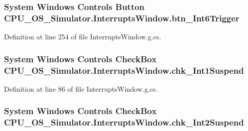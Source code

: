 \subsubsection[{btn\+\_\+\+Int6\+Trigger}]{\setlength{\rightskip}{0pt plus 5cm}System Windows Controls Button C\+P\+U\+\_\+\+O\+S\+\_\+\+Simulator.\+Interrupts\+Window.\+btn\+\_\+\+Int6\+Trigger\hspace{0.3cm}{\ttfamily [package]}}\label{class_c_p_u___o_s___simulator_1_1_interrupts_window_a40f87b0cde439b851823b9f37c5e8adf}


Definition at line 254 of file Interrupts\+Window.\+g.\+cs.

\hypertarget{class_c_p_u___o_s___simulator_1_1_interrupts_window_a5dfca155c40a8043ed74854d0368dd5f}{}
\subsubsection[{chk\+\_\+\+Int1\+Suspend}]{\setlength{\rightskip}{0pt plus 5cm}System Windows Controls Check\+Box C\+P\+U\+\_\+\+O\+S\+\_\+\+Simulator.\+Interrupts\+Window.\+chk\+\_\+\+Int1\+Suspend\hspace{0.3cm}{\ttfamily [package]}}\label{class_c_p_u___o_s___simulator_1_1_interrupts_window_a5dfca155c40a8043ed74854d0368dd5f}


Definition at line 86 of file Interrupts\+Window.\+g.\+cs.

\hypertarget{class_c_p_u___o_s___simulator_1_1_interrupts_window_adfdd177cb50be62b5e3ded2b9a5695ba}{}
\subsubsection[{chk\+\_\+\+Int2\+Suspend}]{\setlength{\rightskip}{0pt plus 5cm}System Windows Controls Check\+Box C\+P\+U\+\_\+\+O\+S\+\_\+\+Simulator.\+Interrupts\+Window.\+chk\+\_\+\+Int2\+Suspend\hspace{0.3cm}{\ttfamily [package]}}\label{class_c_p_u___o_s___simulator_1_1_interrupts_window_adfdd177cb50be62b5e3ded2b9a5695ba}


